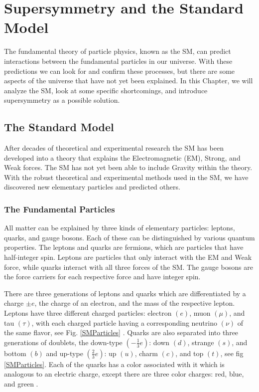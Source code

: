 \chapter{Supersymmetry and the Standard Model}
\label{ch:SUSY}

The fundamental theory of particle physics, known as the SM, can predict interactions between the fundamental particles in our universe. With these predictions we can look for and confirm these processes, but there are some aspects of the universe that have not yet been explained. In this Chapter, we will analyze the SM, look at some specific shortcomings, and introduce supersymmetry as a possible solution.

\section{The Standard Model}
\label{sec:SM}

After decades of theoretical and experimental research the SM has been developed into a theory that explains the Electromagnetic (EM), Strong, and Weak forces. The SM has not yet been able to include Gravity within the theory. With the robust theoretical and experimental methods used in the SM, we have discovered new elementary particles and predicted others. 

\subsection{The Fundamental Particles}

 All matter can be explained by three kinds of elementary particles: leptons, quarks, and gauge bosons. Each of these can be distinguished by various quantum properties. The leptons and quarks are fermions, which are particles that have half-integer spin. Leptons are particles that only interact with the EM and Weak force, while quarks interact with all three forces of the SM. The gauge bosons are the force carriers for each respective force and have integer spin. 
 
 There are three generations of leptons and quarks which are differentiated by a charge $\pm e$, the charge of an electron, and the mass of the respective lepton. Leptons have three different charged particles: electron $(e)$, muon $(\mu)$, and tau $(\tau)$, with each charged particle having a corresponding neutrino $(\nu)$ of the same flavor, see Fig. \ref{SMParticles} \cite{griffiths_introduction_2008}. Quarks are also separated into three generations of doublets, the down-type $(-\frac{1}{3}e)$: down $(d)$, strange $(s)$, and bottom $(b)$ and up-type $(\frac{2}{3}e)$: up $(u)$, charm $(c)$, and top $(t)$, see fig \ref{SMParticles}. Each of the quarks has a color associated with it which is analogous to an electric charge, except there are three color charges: red, blue, and green \cite{griffiths_introduction_2008}.  

